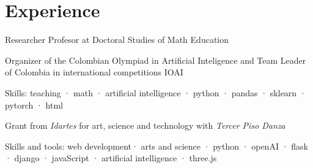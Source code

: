\documentclass[]{plushcv}
\begin{document}
\begin{minipage}[t]{0.70\textwidth} 



\section{Experience}

\vspace{\topsep} %
\begin{tightemize}
\sectionsep
\item Researcher Profesor at Doctoral Studies of Math Education
\item Organizer of the Colombian Olympiad in Artificial Inteligence and Team Leader of Colombia in international competitions IOAI  
\item Skills: teaching · math  · artificial intelligence · python  · pandas · sklearn · pytorch · html 
\end{tightemize}
\sectionsep



\vspace{\topsep} %
\begin{tightemize}
\sectionsep
\item Grant from \emph{Idartes} for art, science and technology with \emph{Tercer Piso Danza}
\item Skills and tools: web development· arts and science · python · openAI · flask · django · javaScript  · artificial intelligence · three.js 
\end{tightemize}
\sectionsep



\end{minipage}
\end{document}
